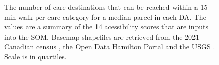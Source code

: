 \documentclass[
  authoryear,
  preprint,
  3p]{elsarticle}
\begin{document}
\begin{figure}


\caption{\label{fig-Fig4}The number of care destinations that can be
reached within a 15-min walk per care category for a median parcel in
each DA. The values are a summary of the 14 acessibility scores that are
inputs into the SOM. Basemap shapefiles are retrieved from the 2021
Canadian census \citep{governmentofcanadaCensusPopulation2023}, the Open
Data Hamilton Portal \citep{opendatahamiltonCityBoundary2023} and the
USGS \citep{greatlakesUSGS2010}. Scale is in quartiles.}

\end{figure}%
\end{document}
